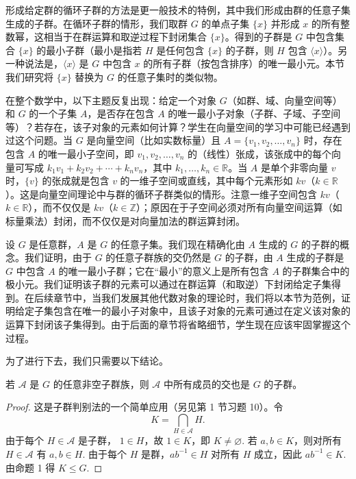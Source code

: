 形成给定群的循环子群的方法是更一般技术的特例，其中我们形成由群的任意子集生成的子群。在循环子群的情形，我们取群 \( G \) 的单点子集 \( \{x\} \) 并形成 \( x \) 的所有整数幂，这相当于在群运算和取逆过程下封闭集合 \( \{x\} \)。得到的子群是 \( G \) 中包含集合 \( \{x\} \) 的最小子群（最小是指若 \( H \) 是任何包含 \( \{x\} \) 的子群，则 \( H \) 包含 \( \langle x \rangle \)）。另一种说法是，\( \langle x \rangle \) 是 \( G \) 中包含 \( x \) 的所有子群（按包含排序）的唯一最小元。本节我们研究将 \( \{x\} \) 替换为 \( G \) 的任意子集时的类似物。

在整个数学中，以下主题反复出现：给定一个对象 \( G \)（如群、域、向量空间等）和 \( G \) 的一个子集 \( A \)，是否存在包含 \( A \) 的唯一最小子对象（子群、子域、子空间等）？若存在，该子对象的元素如何计算？学生在向量空间的学习中可能已经遇到过这个问题。当 \( G \) 是向量空间（比如实数标量）且 \( A = \{v_1, v_2, \ldots, v_n\} \) 时，存在包含 \( A \) 的唯一最小子空间，即 \( v_1, v_2, \ldots, v_n \) 的（线性）张成，该张成中的每个向量可写成 \( k_1 v_1 + k_2 v_2 + \cdots + k_n v_n \)，其中 \( k_1, \ldots, k_n \in \mathbb{R} \)。当 \( A \) 是单个非零向量 \( v \) 时，\( \{v\} \) 的张成就是包含 \( v \) 的一维子空间或直线，其中每个元素形如 \( kv \)（\( k \in \mathbb{R} \)）。这是向量空间理论中与群的循环子群类似的情形。注意一维子空间包含 \( kv \)（\( k \in \mathbb{R} \)），而不仅仅是 \( kv \)（\( k \in \mathbb{Z} \)）；原因在于子空间必须对所有向量空间运算（如标量乘法）封闭，而不仅仅是对向量加法的群运算封闭。

设 \( G \) 是任意群，\( A \) 是 \( G \) 的任意子集。我们现在精确化由 \( A \) 生成的 \( G \) 的子群的概念。我们证明，由于 \( G \) 的任意子群族的交仍然是 \( G \) 的子群，由 \( A \) 生成的子群是 \( G \) 中包含 \( A \) 的唯一最小子群；它在“最小”的意义上是所有包含 \( A \) 的子群集合中的极小元。我们证明该子群的元素可以通过在群运算（和取逆）下封闭给定子集得到。在后续章节中，当我们发展其他代数对象的理论时，我们将以本节为范例，证明给定子集包含在唯一的最小子对象中，且该子对象的元素可通过在定义该对象的运算下封闭该子集得到。由于后面的章节将省略细节，学生现在应该牢固掌握这个过程。

为了进行下去，我们只需要以下结论。

\begin{proposition}
若 \(\mathcal{A}\) 是 \(G\) 的任意非空子群族，则 \(\mathcal{A}\) 中所有成员的交也是 \(G\) 的子群。
\end{proposition}

\begin{proof}
这是子群判别法的一个简单应用（另见第 1 节习题 10）。令
\[
K = \bigcap_{H \in \mathcal{A}} H.
\]
由于每个 \(H \in \mathcal{A}\) 是子群，
\(1 \in H\)，故 \(1 \in K\)，即 \(K \neq \varnothing\). 若 \(a, b \in K\)，则对所有 \(H \in \mathcal{A}\) 有 \(a, b \in H\). 由于每个 \(H\) 是群，\(ab^{-1} \in H\) 对所有 \(H\) 成立，因此 \(ab^{-1} \in K\). 由命题 1 得 \(K \leq G\).
\end{proof}

